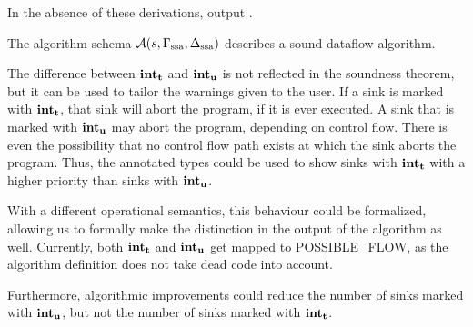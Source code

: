 In the absence of these derivations, output .
\begin{corollary}
    The algorithm schema $\operatorname{\mathcal{A}}(s, \Gamma_\text{ssa}, \Delta_\text{ssa})$ describes a sound dataflow algorithm.
\end{corollary}

The difference between $\textbf{int}_\textbf{t}$ and $\textbf{int}_\textbf{u}$ is not reflected in the soundness theorem,
but it can be used to tailor the warnings given to the user.
If a sink is marked with $\textbf{int}_\textbf{t}$, that sink will abort the program, if it is ever
executed.
A sink that is marked with $\textbf{int}_\textbf{u}$ may abort the program, depending on control flow.
There is even the possibility that no control flow path exists at which the sink aborts 
the program.
Thus, the annotated types could be used to show sinks with $\textbf{int}_\textbf{t}$ with a higher
priority than sinks with $\textbf{int}_\textbf{u}$.

With a different operational semantics, this behaviour could be formalized, allowing us to
formally make the distinction in the output of the algorithm as well.
Currently, both $\textbf{int}_\textbf{t}$ and $\textbf{int}_\textbf{u}$ get mapped to POSSIBLE\_FLOW,
as the algorithm definition does not take dead code into account.

Furthermore, algorithmic improvements could reduce the number of sinks marked with 
$\textbf{int}_\textbf{u}$, but not the number of sinks marked with $\textbf{int}_\textbf{t}$.
